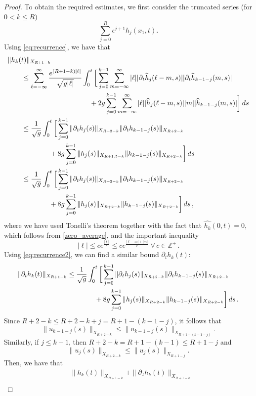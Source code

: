 \documentclass[11pt]{article}
\theoremstyle{plain}
\theoremstyle{definition}
\theoremstyle{definition}
\def\bbZ{{\mathbb Z}}
\def\p{\text{\bf\emph{p}}}
\def\ft #1{{\widehat{#1}}}
\def\p{{\partial\hspace{1pt}}}
\begin{document}
\begin{proof}
To obtain the required estimates, we first consider the truncated series (for $0<k\leq R$)
$$
\sum_{j=0}^R\epsilon^{j+1}h_j(x_1,t).
$$
Using \eqref{eq:recurrence}, we have that
\begin{align*}
& \|h_k(t)\|_{X_{R+1-k}} \\
&\qquad\leq \sum_{\ell=-\infty}^{\infty}\frac{e^{(R+1-k)|\ell|}}{\sqrt{g |\ell|}}\int_0^t\bigg{[}\sum_{j=0}^{k-1}\sum_{m=-\infty}^{\infty}|\ell||\p_{\!t}\ft{h}_{j}(\ell-m,s)||\p_{\!t}\ft{h}_{k-1-j}(m,s)|\nonumber\\
&\qquad\qquad\qquad\qquad\qquad\qquad\! +2g\sum_{j=0}^{k-1}\sum_{m=-\infty}^{\infty} |\ell||\ft{h}_{j}(\ell-m,s)||m| |\ft{h}_{k-1-j}(m,s)|\bigg{]}\,ds\\
&\qquad \leq \frac{1}{\sqrt{g}}\int_0^t\bigg{[}\sum_{j=0}^{k-1}\|\p_{\!t}h_{j}(s)\|_{X_{R+2-k}}\|\p_{\!t}h_{k-1-j}(s)\|_{X_{R+2-k}}\\
&\qquad\qquad\qquad +8g\sum_{j=0}^{k-1}\|h_{j}(s)\|_{X_{R+1.5-k}}\|h_{k-1-j}(s)\|_{X_{R+2-k}}\bigg{]}\,ds\\
&\qquad\leq \frac{1}{\sqrt{g}}\int_0^t\bigg{[}\sum_{j=0}^{k-1}\|\p_{\!t}h_{j}(s)\|_{X_{R+2-k}}\|\p_{\!t}h_{k-1-j}(s)\|_{X_{R+2-k}}\\
&\qquad\qquad\qquad +8g\sum_{j=0}^{k-1}\|h_{j}(s)\|_{X_{R+2-k}}\|h_{k-1-j}(s)\|_{X_{R+2-k}}\bigg{]}\,ds\,,
\end{align*}
where we have used Tonelli's theorem together with the fact that
$\ft{h_k}(0,t)=0$, which follows from \eqref{zero_average},
and the important inequality
\begin{equation}\label{eq:aux}
|\ell|\leq ce^{\frac{|\ell|}{c}}\leq ce^{\frac{|\ell-m|+|m|}{c}}\;\forall\,c\in \bbZ^+\,.
\end{equation}
Using \eqref{eq:recurrence2}, we can find a similar bound $\partial_t h_k(t)$:
\begin{align*}
\|\partial_t h_k(t)\|_{X_{R+1-k}} &\leq \frac{1}{\sqrt{g}}\int_0^t\bigg{[}\sum_{j=0}^{k-1}\|\p_{\!t}h_{j}(s)\|_{X_{R+2-k}}\|\p_{\!t}h_{k-1-j}(s)\|_{X_{R+2-k}}\\
&\qquad\qquad +8g\sum_{j=0}^{k-1}\|h_{j}(s)\|_{X_{R+2-k}}\|h_{k-1-j}(s)\|_{X_{R+2-k}}\bigg{]}\,ds\,.
\end{align*}
Since $R+2-k\leq R+2-k+j =R+1-(k-1-j)$, it follows that
$$
\|u_{k-1-j}(s)\|_{X_{R+2-k}}\leq \|u_{k-1-j}(s)\|_{X_{R+1-(k-1-j)}}.
$$
Similarly, if $j\leq k-1$, then $R+2-k=R+1-(k-1)\leq R+1-j$ and
$$
\|u_{j}(s)\|_{X_{R+2-k}}\leq \|u_{j}(s)\|_{X_{R+1-j}}.
$$
Then, we have that
\begin{align}
& \|h_k(t)\|_{X_{R+1-k}}+\|\p_{\!t} h_k(t)\|_{X_{R+1-k}}\nonumber\\

\end{align}
\end{proof}
\end{document}
